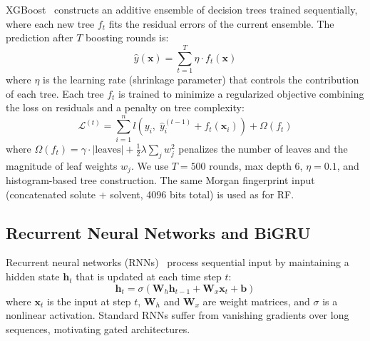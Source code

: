 \documentclass[journal=jcisd8,manuscript=article]{achemso}
\newcommand{\vect}[1]{\mathbf{#1}}
\newcommand{\matr}[1]{\mathbf{#1}}
\begin{document}
XGBoost~\cite{chen2016xgboost} constructs an additive ensemble of decision trees trained sequentially, where each new tree $f_t$ fits the residual errors of the current ensemble.
The prediction after $T$ boosting rounds is:
\begin{equation}
    \hat{y}(\vect{x}) = \sum_{t=1}^{T} \eta \cdot f_t(\vect{x})
\end{equation}
where $\eta$ is the learning rate (shrinkage parameter) that controls the contribution of each tree.
Each tree $f_t$ is trained to minimize a regularized objective combining the loss on residuals and a penalty on tree complexity:
\begin{equation}
    \mathcal{L}^{(t)} = \sum_{i=1}^{n} l\!\left(y_i,\; \hat{y}_i^{(t-1)} + f_t(\vect{x}_i)\right) + \Omega(f_t)
\end{equation}
where $\Omega(f_t) = \gamma \cdot |\text{leaves}| + \tfrac{1}{2}\lambda \sum_j w_j^2$ penalizes the number of leaves and the magnitude of leaf weights $w_j$.
We use $T = 500$ rounds, max depth 6, $\eta = 0.1$, and histogram-based tree construction.
The same Morgan fingerprint input (concatenated solute + solvent, 4096 bits total) is used as for RF.


\subsection{Recurrent Neural Networks and BiGRU}
\label{sec:bigru}

Recurrent neural networks (RNNs)~\cite{elman1990finding} process sequential input by maintaining a hidden state $\vect{h}_t$ that is updated at each time step $t$:
\begin{equation}
    \vect{h}_t = \sigma(\matr{W}_h \vect{h}_{t-1} + \matr{W}_x \vect{x}_t + \vect{b})
\end{equation}
where $\vect{x}_t$ is the input at step $t$, $\matr{W}_h$ and $\matr{W}_x$ are weight matrices, and $\sigma$ is a nonlinear activation.
Standard RNNs suffer from vanishing gradients over long sequences, motivating gated architectures.
\end{document}
